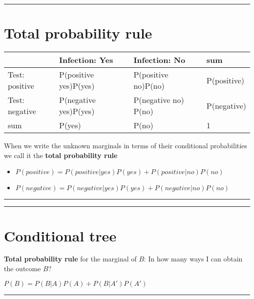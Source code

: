 \documentclass[
]{book}
\providecommand{\tightlist}{%
  \setlength{\itemsep}{0pt}\setlength{\parskip}{0pt}}
\begin{document}
\begin{center}\rule{0.5\linewidth}{0.5pt}\end{center}

\hypertarget{total-probability-rule}{%
\section{Total probability rule}\label{total-probability-rule}}

\begin{longtable}[]{@{}llll@{}}
\toprule
& Infection: Yes & Infection: No & sum \\
\midrule
\endhead
Test: positive & P(positive {\textbar{}} yes)P(yes) & P(positive {\textbar{}} no)P(no) & P(positive) \\
Test: negative & P(negative {\textbar{}} yes)P(yes) & P(negative {\textbar{}} no) P(no) & P(negative) \\
sum & P(yes) & P(no) & 1 \\
\bottomrule
\end{longtable}

When we write the unknown marginals in terms of their conditional probabilities we call it the \textbf{total probability rule}

\begin{itemize}
\tightlist
\item
  \(P(positive)=P(positive|yes)P(yes)+P(positive|no)P(no)\)
\item
  \(P(negative)=P(negative|yes)P(yes)+P(negative|no)P(no)\)
\end{itemize}

\begin{center}\rule{0.5\linewidth}{0.5pt}\end{center}

\begin{center}\rule{0.5\linewidth}{0.5pt}\end{center}

\hypertarget{conditional-tree-1}{%
\section{Conditional tree}\label{conditional-tree-1}}

\textbf{Total probability rule} for the marginal of \(B\): In how many ways I can obtain the outcome \(B\)?

\(P(B)=P(B|A)P(A)+P(B|A')P(A')\)

\begin{center}\rule{0.5\linewidth}{0.5pt}\end{center}
\end{document}
